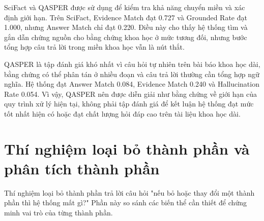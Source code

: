 \documentclass[../DoAn.tex]{subfiles}
\begin{document}
SciFact và QASPER được sử dụng để kiểm tra khả năng chuyển miền và xác định giới hạn. Trên SciFact, Evidence Match đạt 0.727 và Grounded Rate đạt 1.000, nhưng Answer Match chỉ đạt 0.220. Điều này cho thấy hệ thống tìm và gắn dẫn chứng nguồn cho bằng chứng khoa học ở mức tương đối, nhưng bước tổng hợp câu trả lời trong miền khoa học vẫn là nút thắt.

QASPER là tập đánh giá khó nhất vì câu hỏi tự nhiên trên bài báo khoa học dài, bằng chứng có thể phân tán ở nhiều đoạn và câu trả lời thường cần tổng hợp ngữ nghĩa. Hệ thống đạt Answer Match 0.084, Evidence Match 0.240 và Hallucination Rate 0.054. Vì vậy, QASPER nên được diễn giải như bằng chứng về giới hạn của quy trình xử lý hiện tại, không phải tập đánh giá để kết luận hệ thống đạt mức tốt nhất hiện có hoặc đạt chất lượng hỏi đáp cao trên tài liệu khoa học dài.

\section{Thí nghiệm loại bỏ thành phần và phân tích thành phần}

Thí nghiệm loại bỏ thành phần trả lời câu hỏi "nếu bỏ hoặc thay đổi một thành phần thì hệ thống mất gì?" Phần này so sánh các biến thể cần thiết để chứng minh vai trò của từng thành phần.
\end{document}
